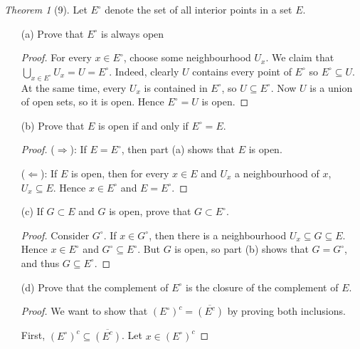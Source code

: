 \documentclass[12pt]{article}
\theoremstyle{remark}
\theoremstyle{named}
\newtheorem*{theorem}{Theorem}
\renewcommand{\implies}{\Rightarrow}
\newcommand{\coimplies}{\Leftarrow}
\begin{document}
\begin{theorem}[9]
    Let $E^\circ$ denote the set of all interior points in a set $E$. 
    \begin{enumerate}
        \item[(a)] Prove that $E^\circ$ is always open
        
        \begin{proof}
            For every $x \in E^\circ$, choose some neighbourhood $U_x$. We claim that $\bigcup_{x \in E^\circ} U_x = U = E^\circ$. Indeed, clearly $U$ contains every point of $E^\circ$ so $E^\circ \subseteq U$. At the same time, every $U_x$ is contained in $E^\circ$, so $U \subseteq E^\circ$. Now $U$ is a union of open sets, so it is open. Hence $E^\circ = U$ is open.
        \end{proof}

        \item[(b)] Prove that $E$ is open if and only if $E^\circ = E$.
        
        \begin{proof}
            ($\implies$): If $E = E^\circ$, then part (a) shows that $E$ is open. 
            
            ($\coimplies$): If $E$ is open, then for every $x \in E$ and $U_x$ a neighbourhood of $x$, $U_x \subseteq E$. Hence $x \in E^\circ$ and $E = E^\circ$.
        \end{proof}

        \item[(c)] If $G \subset E$ and $G$ is open, prove that $G \subset E^\circ$.
        
        \begin{proof}
            Consider $G^\circ$. If $x \in G^\circ$, then there is a neighbourhood $U_x \subseteq G \subseteq E$. Hence $x \in E^\circ$ and $G^\circ \subseteq E^\circ$. But $G$ is open, so part (b) shows that $G = G^\circ$, and thus $G \subseteq E^\circ$. 
        \end{proof}

        \item[(d)] Prove that the complement of $E^\circ$ is the closure of the complement of $E$.
        
        \begin{proof}
            We want to show that $(E^\circ)^c = \overline{(E^c)}$ by proving both inclusions. 

            First, $(E^\circ)^c \subseteq \overline{(E^c)}$. Let $x \in (E^\circ)^c$
        \end{proof}
        

\end{enumerate}
\end{theorem}
\end{document}
